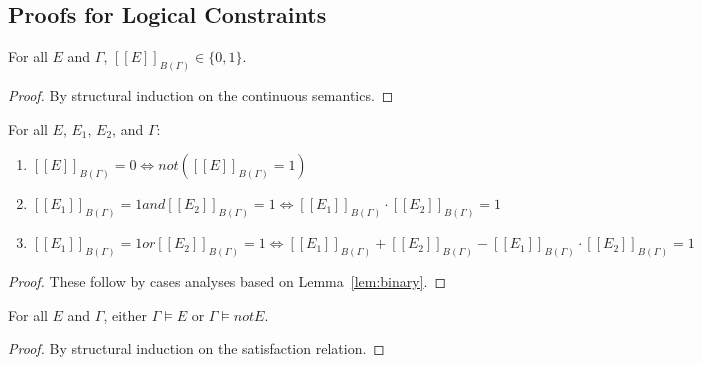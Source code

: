 \documentclass[acmsmall, review, anonymous]{acmart}\settopmatter{printfolios=true,printccs=false,printacmref=false}
\newcommand{\qqpi}[2]{[\![#2]\!]_{#1}}
\begin{document}
\subsection{Proofs for Logical Constraints}


\begin{lemma} \label{lem:binary}
    For all $E$ and $\Gamma$, $\qqpi{B(\Gamma)}{E} \in \{0,1\}$.
\end{lemma}

\begin{proof} %
    By structural induction on the continuous semantics.
\end{proof}


\begin{lemma}
For all $E$, $E_1$, $E_2$, and $\Gamma$:
\begin{enumerate}
    \item $\qqpi{B(\Gamma)}{E} = 0 \Leftrightarrow{} not (\qqpi{B(\Gamma)}{E} = 1)$
    \item $\qqpi{B(\Gamma)}{E_1} = 1 \mathrel{and} \qqpi{B(\Gamma)}{E_2} = 1 \Leftrightarrow{}  \qqpi{B(\Gamma)}{E_1} \cdot \qqpi{B(\Gamma)}{E_2} = 1$
    \item $\qqpi{B(\Gamma)}{E_1} = 1 \mathrel{or} \qqpi{B(\Gamma)}{E_2} = 1 \Leftrightarrow{}  \qqpi{B(\Gamma)}{E_1} + \qqpi{B(\Gamma)}{E_2} - \qqpi{B(\Gamma)}{E_1} \cdot \qqpi{B(\Gamma)}{E_2} = 1$
\end{enumerate}
\end{lemma}
\begin{proof}
  These follow by cases analyses based on Lemma~\ref{lem:binary}.
\end{proof}


\begin{lemma} \label{lem:models}
    For all $E$ and $\Gamma$, either $\Gamma \models E$ or $\Gamma \models{} \mathrel{not} E$.
\end{lemma}

\begin{proof}
    By structural induction on the satisfaction relation.
\end{proof}


\end{document}
